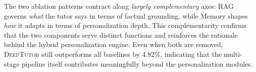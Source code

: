 The two ablation patterns contract along \emph{largely complementary} axes: RAG governs \emph{what} the tutor says in terms of factual grounding, while Memory shapes \emph{how} it adapts in terms of personalization depth.
This complementarity confirms that the two components serve distinct functions and reinforces the rationale behind the hybrid personalization engine.
Even when both are removed, \textsc{DeepTutor} still outperforms all baselines by 4.82\%, indicating that the multi-stage pipeline itself contributes meaningfully beyond the personalization modules.
